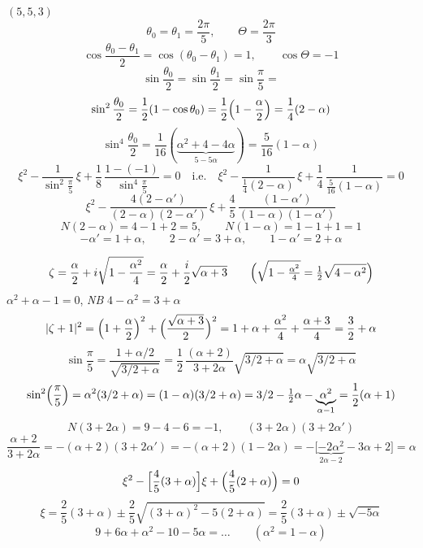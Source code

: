 \documentclass[11pt,a4paper]{article}
\begin{document}

$\boxed{(5,5,3)}$
\[
\theta_0 = \theta_1 = \frac{2\pi}{5},\qquad \Theta = \frac{2\pi}{3}
\]
\[
\cos\frac{\theta_0 - \theta_1}{2} = \cos(\theta_0 - \theta_1) = 1,\qquad
\cos\Theta = -1
\]
\[
\sin\frac{\theta_0}{2} = \sin\frac{\theta_1}{2} = \sin\frac{\pi}{5} = 
\]
\[
\sin^2\frac{\theta_0}{2} = \frac{1}{2}(1 - \cos\theta_0)
= \frac{1}{2}\Bigl(1 - \frac{\alpha}{2}\Bigr) = \frac{1}{4}(2 - \alpha)
\]
\[
\sin^4\frac{\theta_0}{2} = \frac{1}{16}(\underbrace{\alpha^2 + 4 - 4\alpha}_{5 - 5\alpha})
= \frac{5}{16}(1 - \alpha)
\]
\[
\xi^2 - \frac{1}{\sin^2\frac{\pi}{5}}\,\xi
+ \frac{1}{8}\,\frac{1 - (-1)}{\sin^4\frac{\pi}{5}} = 0
\quad\text{i.e.}\quad
\xi^2 - \frac{1}{\frac{1}{4}(2 - \alpha)}\,\xi
+ \frac{1}{4}\,\frac{1}{\frac{5}{16}(1 - \alpha)} = 0
\]
\[
\xi^2 - \frac{4(2 - \alpha')}{(2 - \alpha)(2 - \alpha')}\,\xi
+ \frac{4}{5}\,\frac{(1 - \alpha')}{(1 - \alpha)(1 - \alpha')}
\]
\[
N(2 - \alpha) = 4 - 1 + 2 = 5,\qquad N(1 - \alpha) = 1 - 1 + 1 = 1
\]
\[
-\alpha' = 1 + \alpha,\qquad 2 - \alpha' = 3 + \alpha,\qquad
1 - \alpha' = 2 + \alpha
\]

\[
\zeta = \frac{\alpha}{2} + i\sqrt{1 - \frac{\alpha^2}{4}}
= \frac{\alpha}{2} + \frac{i}{2}\sqrt{\alpha + 3}
\qquad \Bigl(\sqrt{1 - \tfrac{\alpha^2}{4}} = \tfrac{1}{2}\sqrt{4 - \alpha^2}\Bigr)
\]
$\alpha^2 + \alpha - 1 = 0$, \emph{NB} $4 - \alpha^2 = 3 + \alpha$
\[
|\zeta + 1|^2 = \Bigl(1 + \frac{\alpha}{2}\Bigr)^2
+ \Bigl(\frac{\sqrt{\alpha + 3}}{2}\Bigr)^2
= 1 + \alpha + \frac{\alpha^2}{4} + \frac{\alpha + 3}{4}
= \frac{3}{2} + \alpha
\]
\[
\sin\frac{\pi}{5} = \frac{1 + \alpha/2}{\sqrt{3/2 + \alpha}}
= \frac{1}{2}\,\frac{(\alpha + 2)}{3 + 2\alpha}\sqrt{3/2 + \alpha}
= \alpha\sqrt{3/2 + \alpha}
\]
\[
\sin^2\Bigl(\frac{\pi}{5}\Bigr) = \alpha^2(3/2 + \alpha)
= (1 - \alpha)(3/2 + \alpha)
= 3/2 - \tfrac{1}{2}\alpha - \underbrace{\alpha^2}_{\alpha - 1}
= \frac{1}{2}(\alpha + 1)
\]
\[
N(3 + 2\alpha) = 9 - 4 - 6 = -1,\qquad (3 + 2\alpha)(3 + 2\alpha')
\]
\[
\frac{\alpha + 2}{3 + 2\alpha} = -(\alpha + 2)(3 + 2\alpha')
= -(\alpha + 2)(1 - 2\alpha)
= -\bigl[\underbrace{-2\alpha^2}_{2\alpha - 2} - 3\alpha + 2\bigr] = \alpha
\]
\[
\xi^2 - \Bigl[\frac{4}{5}(3 + \alpha)\Bigr]\xi + \Bigl(\frac{4}{5}(2 + \alpha)\Bigr) = 0
\]
\[
\xi = \frac{2}{5}(3 + \alpha) \pm \frac{2}{5}
\sqrt{(3 + \alpha)^2 - 5(2 + \alpha)}
= \frac{2}{5}(3 + \alpha) \pm \sqrt{-5\alpha}
\]
\[
9 + 6\alpha + \alpha^2 - 10 - 5\alpha = \ldots
\qquad (\alpha^2 = 1 - \alpha)
\]
\end{document}
